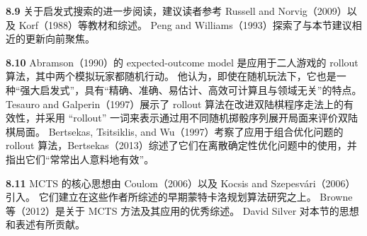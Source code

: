 \documentclass[UTF8, 12pt, fontset=fandol, oneside]{ctexart}
\begin{document}
\noindent\textbf{8.9}
关于启发式搜索的进一步阅读，建议读者参考 Russell and Norvig（2009）以及 Korf（1988）等教材和综述。
Peng and Williams（1993）探索了与本节建议相近的更新向前聚焦。

\noindent\textbf{8.10}
Abramson（1990）的 expected-outcome model 是应用于二人游戏的 rollout 算法，其中两个模拟玩家都随机行动。
他认为，即使在随机玩法下，它也是一种“强大启发式”，具有“精确、准确、易估计、高效可计算且与领域无关”的特点。
Tesauro and Galperin（1997）展示了 rollout 算法在改进双陆棋程序走法上的有效性，并采用 “rollout” 一词来表示通过用不同随机掷骰序列展开局面来评价双陆棋局面。
Bertsekas, Tsitsiklis, and Wu（1997）考察了应用于组合优化问题的 rollout 算法，Bertsekas（2013）综述了它们在离散确定性优化问题中的使用，并指出它们“常常出人意料地有效”。

\noindent\textbf{8.11}
MCTS 的核心思想由 Coulom（2006）以及 Kocsis and Szepesvári（2006）引入。
它们建立在这些作者所综述的早期蒙特卡洛规划算法研究之上。
Browne 等（2012）是关于 MCTS 方法及其应用的优秀综述。
David Silver 对本节的思想和表述有所贡献。
\end{document}
